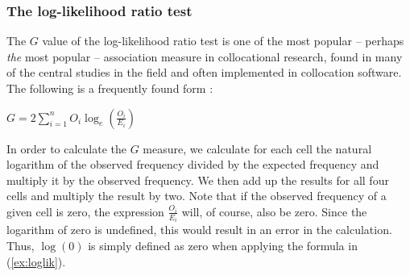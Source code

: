 \subsubsection{The log\hyp{}likelihood ratio test}
\label{sec:amloglikelihood}

The $G$  value of the log\hyp{}likelihood ratio test is one of the most popular -- perhaps \textit{the} most popular -- association  measure  in collocational  research, found in many of the central studies in the field and often implemented in collocation software. The following is a frequently found form \citep[134]{read_goodness--fit_1988}:

\begin{exe}
\ex $G = 2 \sum_{i=1}^{n} O_i \log_e \left(\frac{O_i}{E_i} \right)$
\label{ex:loglik}
\end{exe}

In order to calculate the $G$  measure, we calculate for each cell the natural logarithm  of the observed frequency  divided by the expected  frequency and multiply it by the observed frequency. We then add up the results for all four cells and multiply the result by two. Note that if the observed frequency of a given cell is zero, the expression $\frac{O_i}{E_i}$ will, of course, also be zero. Since the logarithm  of zero is undefined, this would result in an error in the calculation. Thus, $\log(0)$ is simply defined as zero when applying the formula in (\ref{ex:loglik}).


